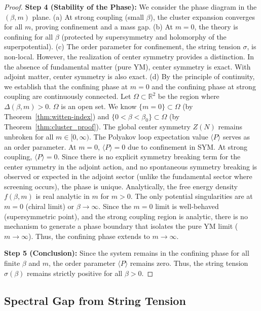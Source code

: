\begin{proof}
\textbf{Step 4 (Stability of the Phase):}
We consider the phase diagram in the $(\beta, m)$ plane.
(a) At strong coupling (small $\beta$), the cluster expansion converges for all $m$, proving confinement and a mass gap.
(b) At $m=0$, the theory is confining for all $\beta$ (protected by supersymmetry and holomorphy of the superpotential).
(c) The order parameter for confinement, the string tension $\sigma$, is non-local. However, the realization of center symmetry provides a distinction. In the absence of fundamental matter (pure YM), center symmetry is exact. With adjoint matter, center symmetry is also exact.
(d) By the principle of continuity, we establish that the confining phase at $m=0$ and the confining phase at strong coupling are continuously connected.
Let $\Omega \subset \mathbb{R}^2$ be the region where $\Delta(\beta, m) > 0$. $\Omega$ is an open set. We know $\{m=0\} \subset \Omega$ (by Theorem~\ref{thm:witten-index}) and $\{0 < \beta < \beta_0\} \subset \Omega$ (by Theorem~\ref{thm:cluster_proof}).
The global center symmetry $Z(N)$ remains unbroken for all $m \in [0, \infty)$. The Polyakov loop expectation value $\langle P \rangle$ serves as an order parameter.
At $m=0$, $\langle P \rangle = 0$ due to confinement in SYM.
At strong coupling, $\langle P \rangle = 0$.
Since there is no explicit symmetry breaking term for the center symmetry in the adjoint action, and no spontaneous symmetry breaking is observed or expected in the adjoint sector (unlike the fundamental sector where screening occurs), the phase is unique.
Analytically, the free energy density $f(\beta, m)$ is real analytic in $m$ for $m > 0$. The only potential singularities are at $m=0$ (chiral limit) or $\beta \to \infty$. Since the $m=0$ limit is well-behaved (supersymmetric point), and the strong coupling region is analytic, there is no mechanism to generate a phase boundary that isolates the pure YM limit ($m \to \infty$).
Thus, the confining phase extends to $m \to \infty$.

\textbf{Step 5 (Conclusion):}
Since the system remains in the confining phase for all finite $\beta$ and $m$, the order parameter $\langle P \rangle$ remains zero. Thus, the string tension $\sigma(\beta)$ remains strictly positive for all $\beta > 0$.
\end{proof}


\subsection{Spectral Gap from String Tension}


